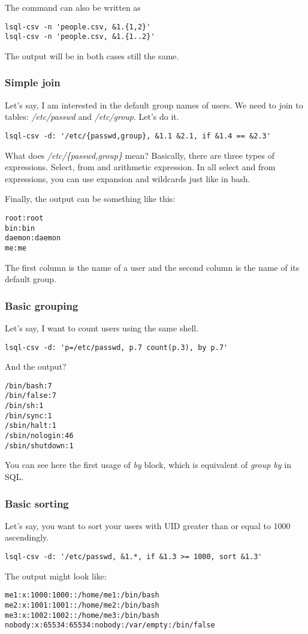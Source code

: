 The command can also be written as
\begin{verbatim}
lsql-csv -n 'people.csv, &1.{1,2}'
lsql-csv -n 'people.csv, &1.{1..2}'
\end{verbatim}
The output will be in both cases still the same.


\subsubsection{Simple join}
Let's say, I am interested in the default group names of users. We need to join to tables: \textit{/etc/passwd} and \textit{/etc/group}. Let's do it.
\begin{verbatim}
lsql-csv -d: '/etc/{passwd,group}, &1.1 &2.1, if &1.4 == &2.3'
\end{verbatim}
What does \textit{/etc/\{passwd,group\}} mean? Basically, there are three types of expressions. Select, from and arithmetic expression. In all select and from expressions, you can use expansion and wildcards just like in bash\cite{bash-reference-manual}.

Finally, the output can be something like this:
\begin{verbatim}
root:root
bin:bin
daemon:daemon
me:me
\end{verbatim}
The first column is the name of a user and the second column is the name of its default group.


\subsubsection{Basic grouping}
Let's say, I want to count users using the same shell.
\begin{verbatim}
lsql-csv -d: 'p=/etc/passwd, p.7 count(p.3), by p.7'
\end{verbatim}
And the output?
\begin{verbatim}
/bin/bash:7
/bin/false:7
/bin/sh:1
/bin/sync:1
/sbin/halt:1
/sbin/nologin:46
/sbin/shutdown:1
\end{verbatim}

You can see here the first usage of \textit{by} block, which is equivalent of \textit{group by} in SQL.

\subsubsection{Basic sorting}
Let's say, you want to sort your users with UID greater than or equal to 1000 ascendingly.
\begin{verbatim}
lsql-csv -d: '/etc/passwd, &1.*, if &1.3 >= 1000, sort &1.3'
\end{verbatim}
The output might look like:
\begin{verbatim}
me1:x:1000:1000::/home/me1:/bin/bash
me2:x:1001:1001::/home/me2:/bin/bash
me3:x:1002:1002::/home/me3:/bin/bash
nobody:x:65534:65534:nobody:/var/empty:/bin/false
\end{verbatim}

